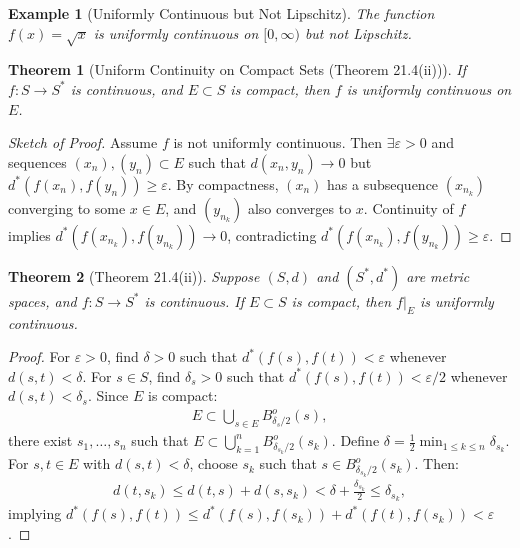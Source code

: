 \documentclass[7pt]{article}
\theoremstyle{definition}
\theoremstyle{plain}
\newtheorem{theorem}{Theorem}
\newtheorem{example}{Example}
\begin{document}
\begin{example}[Uniformly Continuous but Not Lipschitz]
The function $ f(x) = \sqrt{x} $ is uniformly continuous on $ [0, \infty) $ but not Lipschitz.
\end{example}

\begin{theorem}[Uniform Continuity on Compact Sets (Theorem 21.4(ii))]
If $ f : S \to S^* $ is continuous, and $ E \subset S $ is compact, then $ f $ is uniformly continuous on $ E $.
\end{theorem}

\begin{proof}[Sketch of Proof]
Assume $ f $ is not uniformly continuous. Then $ \exists \varepsilon > 0 $ and sequences $ (x_n), (y_n) \subset E $ such that $ d(x_n, y_n) \to 0 $ but $ d^*(f(x_n), f(y_n)) \geq \varepsilon $. By compactness, $ (x_n) $ has a subsequence $ (x_{n_k}) $ converging to some $ x \in E $, and $ (y_{n_k}) $ also converges to $ x $. Continuity of $ f $ implies $ d^*(f(x_{n_k}), f(y_{n_k})) \to 0 $, contradicting $ d^*(f(x_{n_k}), f(y_{n_k})) \geq \varepsilon $.
\end{proof}

\begin{theorem}[Theorem 21.4(ii)]
Suppose $ (S, d) $ and $ (S^*, d^*) $ are metric spaces, and $ f : S \to S^* $ is continuous. If $ E \subset S $ is compact, then $ f|_E $ is uniformly continuous.
\end{theorem}

\begin{proof}
For $ \varepsilon > 0 $, find $ \delta > 0 $ such that $ d^*(f(s), f(t)) < \varepsilon $ whenever $ d(s, t) < \delta $. For $ s \in S $, find $ \delta_s > 0 $ such that $ d^*(f(s), f(t)) < \varepsilon/2 $ whenever $ d(s, t) < \delta_s $. Since $ E $ is compact:
\begin{align}
E \subset \bigcup_{s \in E} B_{\delta_s/2}^o(s),
\end{align}
there exist $ s_1, \ldots, s_n $ such that $ E \subset \bigcup_{k=1}^n B_{\delta_{s_k}/2}^o(s_k) $. Define $ \delta = \frac{1}{2} \min_{1 \leq k \leq n} \delta_{s_k} $. For $ s, t \in E $ with $ d(s, t) < \delta $, choose $ s_k $ such that $ s \in B_{\delta_{s_k}/2}^o(s_k) $. Then:
\begin{align}
d(t, s_k) \leq d(t, s) + d(s, s_k) < \delta + \frac{\delta_{s_k}}{2} \leq \delta_{s_k},
\end{align}
implying $ d^*(f(s), f(t)) \leq d^*(f(s), f(s_k)) + d^*(f(t), f(s_k)) < \varepsilon $.
\end{proof}
\end{document}
